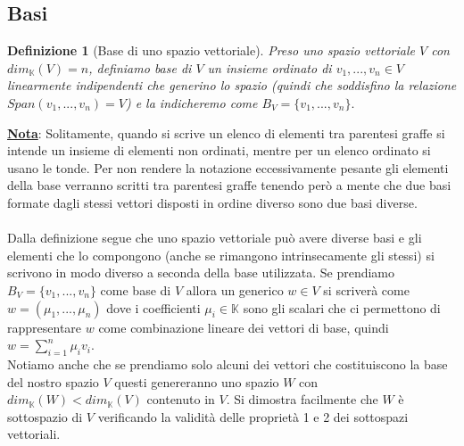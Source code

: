 \documentclass[a4paper,12pt]{report}
\newtheorem{definizione}{Definizione}[chapter]
\begin{document}
\subsection{Basi}

\begin{definizione}[Base di uno spazio vettoriale]
    Preso uno spazio vettoriale $V$ con $dim_{\mathbb{K}}(V)=n$, definiamo base di $V$ un insieme ordinato di $v_1,...,v_n \in V$ linearmente indipendenti che generino lo spazio (quindi che soddisfino la relazione $Span(v_1,...,v_n)=V$) e la indicheremo come $B_V=\{v_1,...,v_n\}.$
\end{definizione}

\textbf{\underline{Nota}}: Solitamente, quando si scrive un elenco di elementi tra parentesi graffe si intende un insieme di elementi non ordinati, mentre per un elenco ordinato si usano le tonde. Per non rendere la notazione eccessivamente pesante gli elementi della base verranno scritti tra parentesi graffe tenendo però a mente che due basi formate dagli stessi vettori disposti in ordine diverso sono due basi diverse.
\\
\\
Dalla definizione segue che uno spazio vettoriale può avere diverse basi e gli elementi che lo compongono (anche se rimangono intrinsecamente gli stessi) si scrivono in modo diverso a seconda della base utilizzata. Se prendiamo $B_V=\{v_1,...,v_n\}$ come base di $V$ allora un generico $w \in V$ si scriverà come $w=(\mu_1,...,\mu_n)$ dove i coefficienti $\mu_i\in \mathbb{K}$ sono gli scalari che ci permettono di rappresentare $w$ come combinazione lineare dei vettori di base, quindi $\displaystyle w=\sum_{i=1}^{n}\mu_iv_i$.
\\
Notiamo anche che se prendiamo solo alcuni dei vettori che costituiscono la base del nostro spazio $V$ questi genereranno uno spazio $W$ con  $dim_{\mathbb{K}}(W) < dim_{\mathbb{K}}(V)$ contenuto in $V$. Si dimostra facilmente che $W$ è sottospazio di $V$ verificando la validità delle proprietà 1 e 2 dei sottospazi vettoriali.
\end{document}
